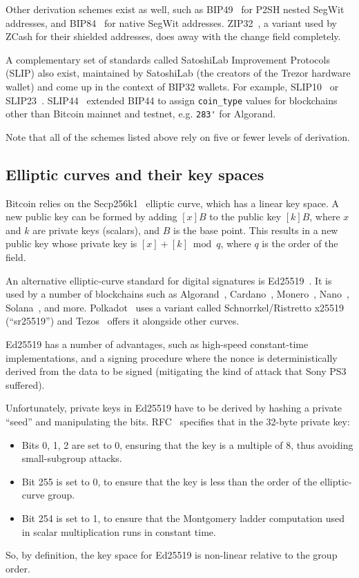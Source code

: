 \documentclass[12pt, a4paper, twocolumn]{article}
\begin{document}
Other derivation schemes exist as well, such as BIP49~\cite{BIP49} for P2SH nested SegWit addresses, and BIP84~\cite{BIP84} for native SegWit addresses. ZIP32~\cite{ZIP32}, a variant used by ZCash for their shielded addresses, does away with the change field completely.

A complementary set of standards called SatoshiLab Improvement Protocols (SLIP) also exist, maintained by SatoshiLab (the creators of the Trezor hardware wallet) and come up in the context of BIP32 wallets.
For example, SLIP10~\cite{SLIP10} or SLIP23~\cite{SLIP23}.
SLIP44~\cite{BIP44} extended BIP44 to assign \verb=coin_type= values for blockchains other than Bitcoin mainnet and testnet, e.g. \verb=283'= for Algorand.

Note that all of the schemes listed above rely on five or fewer levels of derivation.

\subsection{Elliptic curves and their key spaces}
\label{subsec:elliptic_curves_and_their_key_spaces}

Bitcoin relies on the Secp256k1~\cite{Secp256k1} elliptic curve, which has a linear key space.
A new public key can be formed by adding $[x]B$ to the public key $[k]B$, where $x$ and $k$ are private keys (scalars), and $B$ is the base point.
This results in a new public key whose private key is $[x] + [k] \bmod q$, where $q$ is the order of the field.

An alternative elliptic-curve standard for digital signatures is Ed25519~\cite{Ed25519}.
It is used by a number of blockchains such as Algorand~\cite{AlgorandEd25519}, Cardano~\cite{CardanoEd25519}, Monero~\cite{MoneroEd25519}, Nano~\cite{NanoEd25519}, Solana~\cite{SolanaEd25519}, and more.
Polkadot~\cite{PolkadotEd25519} uses a variant called Schnorrkel/Ristretto x25519 (``sr25519'') and Tezos~\cite{TezosEd25519} offers it alongside other curves.

Ed25519 has a number of advantages, such as high-speed constant-time implementations, and a signing procedure where the nonce is deterministically derived from the data to be signed (mitigating the kind of attack that Sony PS3 suffered).

Unfortunately, private keys in Ed25519 have to be derived by hashing a private ``seed'' and manipulating the bits.
RFC~\cite{RFC8032} specifies that in the 32-byte private key:
\begin{itemize}[label=\textendash, itemsep=-0.5em]
\item Bits 0, 1, 2 are set to 0, ensuring that the key is a multiple of 8, thus avoiding small-subgroup attacks.
\item Bit 255 is set to 0, to ensure that the key is less than the order of the elliptic-curve group.
\item Bit 254 is set to 1, to ensure that the Montgomery ladder computation used in scalar multiplication runs in constant time.
\end{itemize}
So, by definition, the key space for Ed25519 is non-linear relative to the group order.
\end{document}
